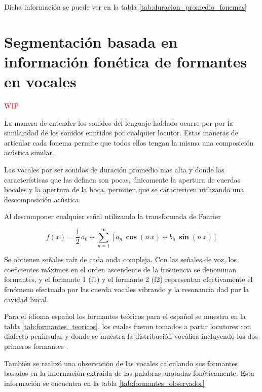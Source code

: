 Dicha información se puede ver en la tabla \ref{tab:duracion_promedio_fonemas}



\section{Segmentación basada en información fonética de formantes en vocales}

\textcolor{red}{WIP}

La manera de entender los sonidos del lenguaje hablado ocurre por por la similaridad de los sonidos emitidos por cualquier locutor. Estas maneras de articular cada fonema permite que todos ellos tengan la misma una composición acústica similar.

Las vocales por ser sonidos de duración promedio mas alta y donde las características que las definen son pocas, únicamente la apertura de cuerdas bocales y la apertura de la boca, permiten que se caractericen utilizando una descomposición acústica.

Al descomponer cualquier señal utilizando la transformada de Fourier

\begin{equation}
\label{eq:fourier}    
f(x) = \frac{1}{2} \, a_{0} + \sum_{n=1}^{\infty} \left[
   a_{n}\,\boldsymbol{\cos} (n\,x) + b_{n} \,\boldsymbol{\sin} (n\,x) \right]
\end{equation}

Se obtienen señales raíz de cada onda compleja. Con las señales de voz, los coeficientes máximos  en el orden ascendente de la frecuencia se denominan formantes, y el formante 1 (f1) y el formante 2 (f2) representan efectivamente el fenómeno efectuado por las cuerda vocales vibrando y la resonancia dad por la cavidad bucal.

Para el idioma español los formantes teóricos para el español se muestra en la tabla \ref{tab:formantes_teoricos}, los cuales fueron tomados a partir locutores con dialecto peninsular y donde se muestra la distribución vocálica incluyendo los dos primeros formantes \cite{Bradlow1995}.



También se realizó una observación de las vocales calculando sus formantes basados en la información extraida de las palabras anotadas fonéticamente. Esta información se encuentra en la tabla \ref{tab:formantes_observador} 



